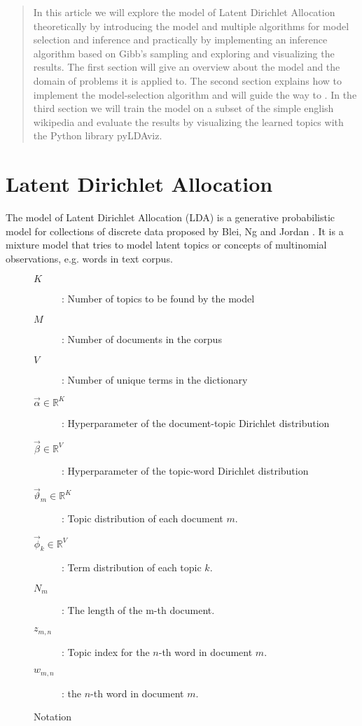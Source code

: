 \documentclass[12 pt,twopage]{article}
\begin{document}
\begin{abstract}

 In this article we will explore the model of Latent Dirichlet Allocation theoretically by introducing the model and multiple algorithms for model selection and inference and practically by implementing an inference algorithm based on Gibb's sampling and exploring and visualizing the results.
 The first section will give an overview about the model and the domain of problems it is applied to.
 The second section explains how to implement the model-selection algorithm and will guide the way to  .
 In the third section we will train the model on a subset of the simple english wikipedia and evaluate the results by visualizing the learned topics with the Python library pyLDAviz.
\end{abstract}

\section{Latent Dirichlet Allocation}
The model of Latent Dirichlet Allocation (LDA) is a generative probabilistic model for collections of discrete data proposed by Blei, Ng and Jordan \cite{Blei2003}. It is a mixture model that tries to model latent topics or concepts of multinomial observations, e.g. words in text corpus.

\begin{figure}[h]
 \begin{center}
  \begin{footnotesize}
   \begin{description}
    \item[\( K \)] : Number of topics to be found by the model
    \item[\( M \)] : Number of documents in the corpus
    \item[\( V \)] : Number of unique terms in the dictionary
    \item[\( \vec\alpha \in \mathbb{R}^K \)] : Hyperparameter of the document-topic Dirichlet distribution
    \item[\( \vec\beta \in \mathbb{R}^V \)] : Hyperparameter of the topic-word Dirichlet distribution
    \item[\( \vec\vartheta_m \in \mathbb{R}^K \)] : Topic distribution of each document \(m\).
    \item[\( \vec\phi_k \in \mathbb{R}^V \)] : Term distribution of each topic \(k\).
    \item[\( N_m \)] : The length of the m-th document.
    \item[\( z_{m,n} \)] : Topic index for the \(n\)-th word in document \(m\).
    \item[\( w_{m,n} \)] : the \(n\)-th word in document \(m\).
   \end{description}
  \end{footnotesize}
 \end{center}
 \caption{Notation}
 \label{fig:notation}
\end{figure}
\end{document}

